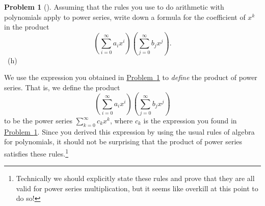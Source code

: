 \documentclass[10pt,]{book}
\theoremstyle{plain}
\theoremstyle{definition}
\newtheorem{activity}[project]{Problem}
\theoremstyle{definition}
\numberwithin{equation}{chapter}
\begin{document}
\begin{activity}[] \label{coeffinpowerseries}
\hypertarget{p-1086}{}%
Assuming that the rules you use to do arithmetic with polynomials apply to power series, write down a formula for the coefficient of \(x^k\) in the product%
\begin{equation*}
\left(\sum_{i=0}^\infty a_ix^i\right)\left(\sum_{j=0}^\infty
b_jx^j\right)\text{.}
\end{equation*}
%
~{\tiny (h)}\end{activity}
\hypertarget{p-1089}{}%
We use the expression you obtained in \hyperref[coeffinpowerseries]{Problem~\ref{coeffinpowerseries}} to \emph{define} the product of power series. That is, we define the product%
\begin{equation*}
\left(\sum_{i=0}^\infty a_ix^i\right)\left(\sum_{j=0}^\infty
b_jx^j\right)
\end{equation*}
to be the power series \(\sum_{k=0}^\infty c_k x^k\), where \(c_k\) is the expression you found in \hyperref[coeffinpowerseries]{Problem~\ref{coeffinpowerseries}}. Since you derived this expression by using the usual rules of algebra for polynomials, it should not be surprising that the product of power series satisfies these rules.\footnote{Technically we should explicitly state these rules and prove that they are all valid for power series multiplication, but it seems like overkill at this point to do so!\label{fn-12}}%
\typeout{************************************************}
\typeout{************************************************}
\end{document}
